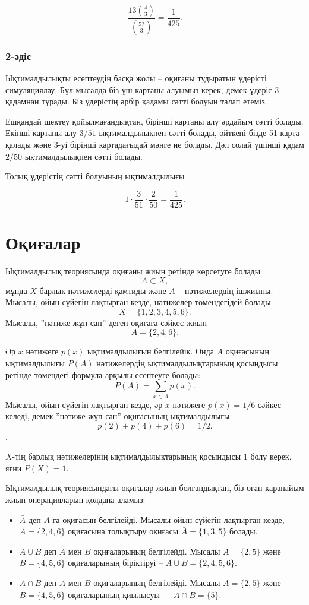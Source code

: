 \[\frac{13 {4 \choose 3}}{{52 \choose 3}} = \frac{1}{425}.\]

\subsubsection*{2-әдіс}

Ықтималдылықты есептеудің басқа жолы --
оқиғаны тудыратын үдерісті симуляциялау.
Бұл мысалда біз үш картаны алуымыз керек,
демек үдеріс 3 қадамнан тұрады. 
Біз үдерістің әрбір қадамы сәтті болуын талап етеміз.

Ешқандай шектеу қойылмағандықтан, бірінші картаны алу әрдайым сәтті болады. Екінші
картаны алу $3/51$ ықтималдылықпен сәтті болады,
өйткені бізде 51 карта қалады және 3-уі 
бірінші картадағыдай мәнге ие болады. Дәл солай
үшінші қадам $2/50$ ықтималдылықпен сәтті болады.

Толық үдерістің сәтті болуының ықтималдылығы 

\[1 \cdot \frac{3}{51} \cdot \frac{2}{50} = \frac{1}{425}.\]

\section{Оқиғалар}

Ықтималдылық теориясында оқиғаны жиын ретінде көрсетуге болады
\[A \subset X,\]
мұнда $X$ барлық нәтижелерді қамтиды және
$A$ -- нәтижелердің ішжиыны.
Мысалы, ойын сүйегін лақтырған кезде, нәтижелер төмендегідей болады:
\[X = \{1,2,3,4,5,6\}.\]
Мысалы, ''нәтиже жұп сан'' деген оқиғаға сәйкес жиын
\[A = \{2,4,6\}.\]

Әр $x$ нәтижеге $p(x)$ ықтималдылығын белгілейік.
Онда $A$ оқиғасының ықтималдылығы $P(A)$ нәтижелердің 
ықтималдылықтарының қосындысы ретінде төмендегі формула
арқылы есептеуге болады:
\[P(A) = \sum_{x \in A} p(x).\]
Мысалы, ойын сүйегін лақтырған кезде,
әр $x$ нәтижеге $p(x)=1/6$ сәйкес келеді,
демек ''нәтиже жұп сан'' оқиғасының
ықтималдылығы \[p(2)+p(4)+p(6)=1/2.\]. 

$X$-тің барлық нәтижелерінің ықтималдылықтарының қосындысы
1 болу керек, яғни $P(X)=1$.

Ықтималдылық теориясындағы оқиғалар жиын болғандықтан,
біз оған қарапайым жиын операцияларын қолдана аламыз:  

\begin{itemize}
\item $\bar A$ деп $A$-ға 
оқиғасын белгілейді. Мысалы ойын сүйегін лақтырған кезде,
$A=\{2,4,6\}$ оқиғасына толықтыру оқиғасы 
$\bar A = \{1,3,5\}$ болады. 
\item $A \cup B$ деп $A$ мен $B$ оқиғаларының 
белгілейді. Мысалы $A=\{2,5\}$ және 
$B=\{4,5,6\}$ оқиғаларының біріктіруі 
-- $A \cup B = \{2,4,5,6\}$. 
\item $A \cap B$ деп $A$ мен $B$ оқиғаларының 
белгілейді. Мысалы $A=\{2,5\}$ және $B=\{4,5,6\}$
оқиғаларының қиылысуы –– $A \cap B = \{5\}$.
\end{itemize}

